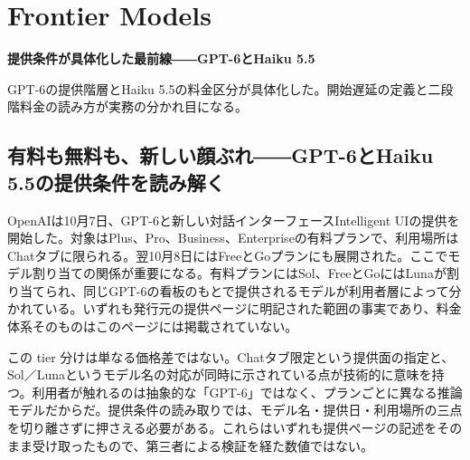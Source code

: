 \section{Frontier Models}
\begin{wideflow}
{\Large\bfseries 提供条件が具体化した最前線――GPT-6とHaiku 5.5\par}
\smallskip
{\color{SurveyMuted}GPT-6の提供階層とHaiku 5.5の料金区分が具体化した。開始遅延の定義と二段階料金の読み方が実務の分かれ目になる。\par}
\end{wideflow}

\subsection*{有料も無料も、新しい顔ぶれ――GPT-6とHaiku 5.5の提供条件を読み解く}

OpenAIは10月7日、GPT-6と新しい対話インターフェースIntelligent UIの提供を開始した。対象はPlus、Pro、Business、Enterpriseの有料プランで、利用場所はChatタブに限られる。翌10月8日にはFreeとGoプランにも展開された。ここでモデル割り当ての関係が重要になる。有料プランにはSol、FreeとGoにはLunaが割り当てられ、同じGPT-6の看板のもとで提供されるモデルが利用者層によって分かれている。いずれも発行元の提供ページに明記された範囲の事実であり、料金体系そのものはこのページには掲載されていない。\cite{gpt6ui}

この tier 分けは単なる価格差ではない。Chatタブ限定という提供面の指定と、Sol／Lunaというモデル名の対応が同時に示されている点が技術的に意味を持つ。利用者が触れるのは抽象的な「GPT-6」ではなく、プランごとに異なる推論モデルだからだ。提供条件の読み取りでは、モデル名・提供日・利用場所の三点を切り離さずに押さえる必要がある。これらはいずれも提供ページの記述をそのまま受け取ったもので、第三者による検証を経た数値ではない。\cite{gpt6ui}

